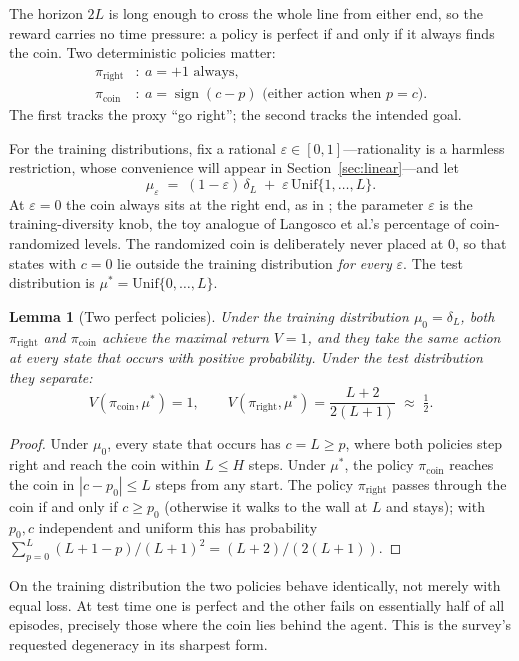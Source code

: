 \documentclass[11pt]{amsart}
\theoremstyle{plain}
\newtheorem{lemma}[theorem]{Lemma}
\theoremstyle{definition}
\begin{document}
The horizon $2L$ is long enough to cross the whole line from either end, so the reward carries no time pressure: a policy is perfect if and only if it always finds the coin. Two deterministic policies matter:
\[
\begin{aligned}
\pi_{\mathrm{right}}&:\ a=+1 \text{ always},\\
\pi_{\mathrm{coin}}&:\ a=\operatorname{sign}(c-p)
  \text{ (either action when }p=c\text{)}.
\end{aligned}
\]
The first tracks the proxy ``go right''; the second tracks the intended goal.

For the training distributions, fix a rational $\varepsilon\in[0,1]$---rationality is a harmless restriction, whose convenience will appear in Section~\ref{sec:linear}---and let
\[
   \mu_\varepsilon \;=\; (1-\varepsilon)\,\delta_L \;+\; \varepsilon\,\mathrm{Unif}\{1,\dots,L\}.
\]
At $\varepsilon=0$ the coin always sits at the right end, as in \cite{langosco2022}; the parameter $\varepsilon$ is the training-diversity knob, the toy analogue of Langosco et al.'s percentage of coin-randomized levels. The randomized coin is deliberately never placed at $0$, so that states with $c=0$ lie outside the training distribution \emph{for every} $\varepsilon$. The test distribution is $\mu^{*}=\mathrm{Unif}\{0,\dots,L\}$.

\begin{lemma}[Two perfect policies]\label{lem:twopolicies}
Under the training distribution $\mu_0=\delta_L$, both $\pi_{\mathrm{right}}$ and $\pi_{\mathrm{coin}}$ achieve the maximal return $V=1$, and they take the same action at every state that occurs with positive probability. Under the test distribution they separate:
\[
   V(\pi_{\mathrm{coin}},\mu^{*})=1,
   \qquad
   V(\pi_{\mathrm{right}},\mu^{*})=\frac{L+2}{2(L+1)}\;\approx\;\tfrac12 .
\]
\end{lemma}

\begin{proof}
Under $\mu_0$, every state that occurs has $c=L\ge p$, where both policies step right and reach the coin within $L\le H$ steps. Under $\mu^{*}$, the policy $\pi_{\mathrm{coin}}$ reaches the coin in $|c-p_0|\le L$ steps from any start. The policy $\pi_{\mathrm{right}}$ passes through the coin if and only if $c\ge p_0$ (otherwise it walks to the wall at $L$ and stays); with $p_0,c$ independent and uniform this has probability $\sum_{p=0}^{L}(L+1-p)/(L+1)^2=(L+2)/(2(L+1))$.
\end{proof}

On the training distribution the two policies behave identically, not merely with equal loss. At test time one is perfect and the other fails on essentially half of all episodes, precisely those where the coin lies behind the agent. This is the survey's requested degeneracy in its sharpest form.
\end{document}
